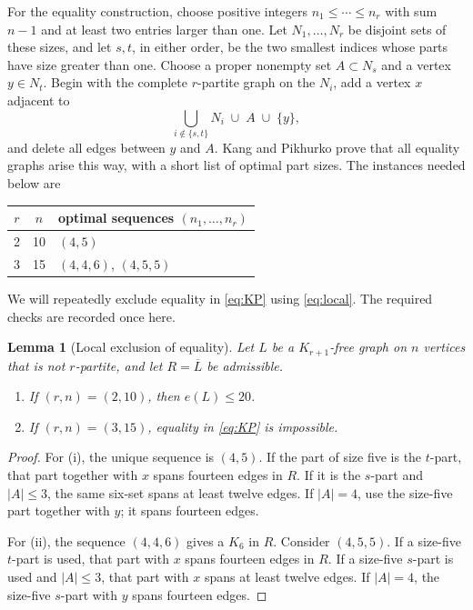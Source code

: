 \documentclass[11pt,reqno,a4paper]{amsart}
\newtheorem{lemma}[theorem]{Lemma}
\theoremstyle{definition}
\theoremstyle{remark}
\newcommand{\comp}[1]{\overline{#1}}
\begin{document}
For the equality construction, choose positive integers
$n_1\leq\cdots\leq n_r$ with sum $n-1$ and at least two entries larger than
one.  Let $N_1,\ldots,N_r$ be disjoint sets of these sizes, and let $s,t$, in
either order, be the two smallest indices whose parts have size greater than
one.  Choose a proper nonempty set $A\subset N_s$ and a vertex $y\in N_t$.
Begin with the
complete $r$-partite graph on the $N_i$, add a vertex $x$ adjacent to
\[
  \bigcup_{i\notin\{s,t\}}N_i\;\cup\;A\;\cup\;\{y\},
\]
and delete all edges between $y$ and $A$.  Kang and Pikhurko prove that all
equality graphs arise this way, with a short list of optimal part sizes.
The instances needed below are
\begin{center}
\begin{tabular}{ccl}
\toprule
$r$ & $n$ & optimal sequences $(n_1,\ldots,n_r)$\\
\midrule
2 & 10 & $(4,5)$\\
3 & 15 & $(4,4,6)$, $(4,5,5)$\\
\bottomrule
\end{tabular}
\end{center}

We will repeatedly exclude equality in \eqref{eq:KP} using
\eqref{eq:local}.  The required checks are recorded once here.

\begin{lemma}[Local exclusion of equality]\label{lem:KP-equality}
Let $L$ be a $K_{r+1}$-free graph on $n$ vertices that is not
$r$-partite, and let $R=\comp L$ be admissible.
\begin{enumerate}[label=\textup{(\roman*)}]
\item If $(r,n)=(2,10)$, then $e(L)\leq20$.
\item If $(r,n)=(3,15)$, equality in \eqref{eq:KP} is impossible.
\end{enumerate}
\end{lemma}

\begin{proof}
For (i), the unique sequence is $(4,5)$.  If the part of size five is the
$t$-part, that part together with $x$ spans fourteen edges in $R$.  If it is
the $s$-part and $|A|\leq3$, the same six-set spans at least twelve edges.  If
$|A|=4$, use the size-five part together with $y$; it spans fourteen edges.

For (ii), the sequence $(4,4,6)$ gives a $K_6$ in $R$.  Consider
$(4,5,5)$.  If a size-five $t$-part is used, that part with $x$ spans
fourteen edges in $R$.  If a size-five $s$-part is used and $|A|\leq3$,
that part with $x$ spans at least twelve edges.  If $|A|=4$, the size-five
$s$-part with $y$ spans fourteen edges.
\end{proof}
\end{document}
